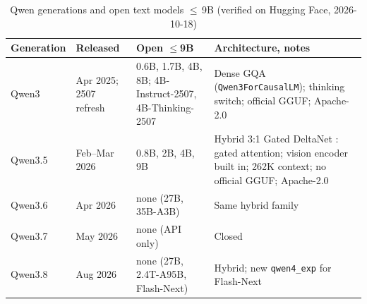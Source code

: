 \begin{table}[t]
\caption{Qwen generations and open text models $\le$\,9B (verified on Hugging Face, 2026-10-18)}
\label{tab:qwengen}
\centering\scriptsize
\begin{tabular}{@{}p{1.2cm}p{1.4cm}p{2.3cm}p{2.7cm}@{}}
\toprule
Generation & Released & Open $\le$9B & Architecture, notes \\
\midrule
Qwen3 & Apr 2025; 2507 refresh & 0.6B, 1.7B, 4B, 8B; 4B-Instruct-2507, 4B-Thinking-2507 & Dense GQA (\texttt{Qwen3ForCausalLM}); thinking switch; official GGUF; Apache-2.0 \\
Qwen3.5 & Feb--Mar 2026 & 0.8B, 2B, 4B, 9B & Hybrid 3:1 Gated DeltaNet : gated attention; vision encoder built in; 262K context; no official GGUF; Apache-2.0 \\
Qwen3.6 & Apr 2026 & none (27B, 35B-A3B) & Same hybrid family \\
Qwen3.7 & May 2026 & none (API only) & Closed \\
Qwen3.8 & Aug 2026 & none (27B, 2.4T-A95B, Flash-Next) & Hybrid; new \texttt{qwen4\_exp} for Flash-Next \\
\bottomrule
\end{tabular}
\end{table}
